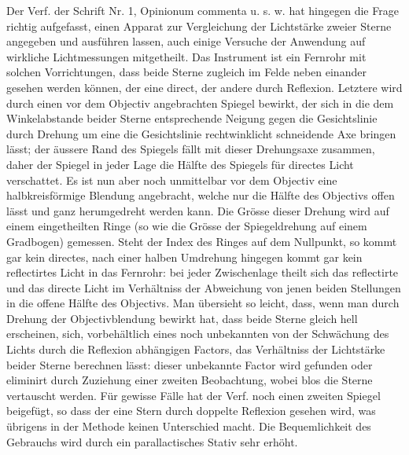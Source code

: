 Der Verf. der Schrift Nr. 1, Opinionum commenta u. s. w. hat hingegen die Frage richtig aufgefasst, einen Apparat zur Vergleichung der Lichtstärke zweier Sterne angegeben und ausführen lassen, auch einige Versuche der Anwendung auf wirkliche Lichtmessungen mitgetheilt. Das Instrument ist ein Fernrohr mit solchen Vorrichtungen, dass beide Sterne zugleich im Felde neben einander gesehen werden können, der eine direct, der andere durch Reflexion. Letztere wird durch einen vor dem Objectiv angebrachten Spiegel bewirkt, der sich in die dem Winkelabstande beider Sterne entsprechende Neigung gegen die Gesichtslinie durch Drehung um eine die Gesichtslinie rechtwinklicht schneidende Axe bringen lässt; der äussere Rand des Spiegels fällt mit dieser Drehungsaxe zusammen, daher der Spiegel in jeder Lage die Hälfte des Spiegels für directes Licht verschattet. Es ist nun aber noch unmittelbar vor dem Objectiv eine halbkreisförmige Blendung angebracht, welche nur die Hälfte des Objectivs offen lässt und ganz herumgedreht werden kann. Die Grösse dieser Drehung wird auf einem eingetheilten Ringe (so wie die Grösse der Spiegeldrehung auf einem Gradbogen) gemessen. Steht der Index des Ringes auf dem Nullpunkt, so kommt gar kein directes, nach einer halben Umdrehung hingegen kommt gar kein reflectirtes Licht in das Fernrohr: bei jeder Zwischenlage theilt sich das reflectirte und das directe Licht im Verhältniss der Abweichung von jenen beiden Stellungen in die offene Hälfte des Objectivs. Man übersieht so leicht, dass, wenn man durch Drehung der Objectivblendung bewirkt hat, dass beide Sterne gleich hell erscheinen, sich, vorbehältlich eines noch unbekannten von der Schwächung des Lichts durch die Reflexion abhängigen Factors, das Verhältniss der Lichtstärke beider Sterne berechnen lässt: dieser unbekannte Factor wird gefunden oder eliminirt durch Zuziehung einer zweiten Beobachtung, wobei blos die Sterne vertauscht werden. Für gewisse Fälle hat der Verf. noch einen zweiten Spiegel beigefügt, so dass der eine Stern durch doppelte Reflexion gesehen wird, was übrigens in der Methode keinen Unterschied macht. Die Bequemlichkeit des Gebrauchs wird durch ein parallactisches Stativ sehr erhöht.

